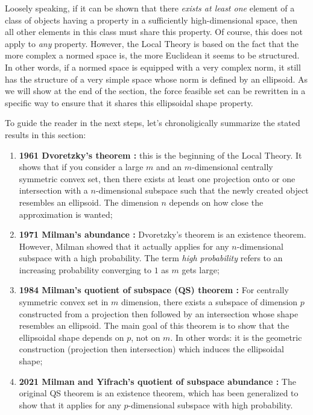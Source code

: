 Loosely speaking, if it can be shown that there \emph{exists at least one} element of a class of objects having a property in a sufficiently high-dimensional space, then all other elements in this class must share this property. Of course, this does not apply to \emph{any} property. However, the Local Theory is based on the fact that the more complex a normed space is, the more Euclidean it seems to be structured. In other words, if a normed space is equipped with a very complex norm, it still has the structure of a very simple space whose norm is defined by an ellipsoid. As we will show at the end of the section, the force feasible set can be rewritten in a specific way to ensure that it shares this ellipsoidal shape property. 

To guide the reader in the next steps, let's chronoligically summarize the stated results in this section:
\begin{enumerate}
    \item { \textbf{1961 Dvoretzky's theorem \cite{milmanDvoretzkyTheoremThirtyYearsLater1992}:} this is the beginning of the Local Theory. It shows that if you consider a large $m$ and an $m$-dimensional centrally symmetric convex set, then there exists at least one projection onto or one intersection with a $n$-dimensional subspace such that the newly created object resembles an ellipsoid. The dimension $n$ depends on how close the approximation is wanted; }
    \item {\textbf{1971 Milman's abundance \cite{milmanAsymptoticTheoryFinite2001}:} Dvoretzky's theorem is an existence theorem. However, Milman showed that it actually applies for any $n$-dimensional subspace with a high probability. The term \emph{high probability} refers to an increasing probability converging to $1$ as $m$ gets large;}
    \item {\textbf{1984 Milman's quotient of subspace (QS) theorem \cite{milmanAlmostEuclideanQuotient}:} For centrally symmetric convex set in $m$ dimension, there exists a subspace of dimension $p$ constructed from a projection then followed by an intersection whose shape resembles an ellipsoid. The main goal of this theorem is to show that the ellipsoidal shape depends on $p$, not on $m$. In other words: it is the geometric construction (projection then intersection) which induces the ellipsoidal shape;}
    \item {\textbf{2021 Milman and Yifrach's quotient of subspace abundance \cite{milmanRegularRandomSections2021}:} The original QS theorem is an existence theorem, which has been generalized to show that it applies for any $p$-dimensional subspace with high probability.}
\end{enumerate}

